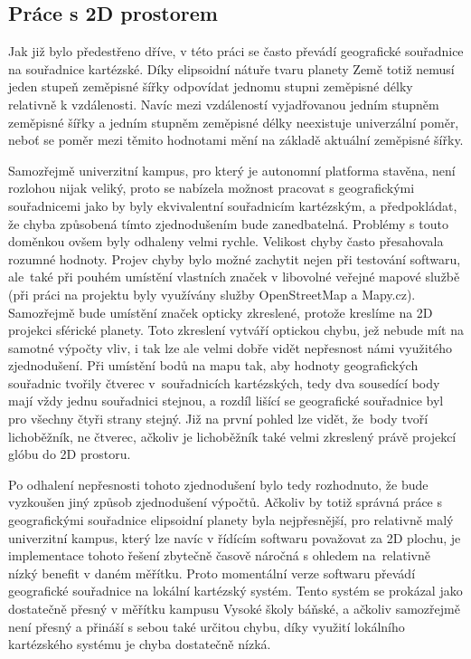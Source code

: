 \documentclass[czech, bachelor]{diploma}
\begin{document}
\subsection{Práce s 2D prostorem} \label{cartesian-coordinates}

Jak již bylo předestřeno dříve, v této práci se často převádí geografické souřadnice na souřadnice kartézské. Díky elipsoidní
nátuře tvaru planety Země totiž nemusí jeden stupeň zeměpisné šířky odpovídat jednomu stupni zeměpisné délky relativně
k vzdálenosti. Navíc mezi vzdáleností vyjadřovanou jedním stupněm zeměpisné šířky a jedním stupněm zeměpisné délky neexistuje
univerzální poměr, neboť se poměr mezi těmito hodnotami mění na základě aktuální zeměpisné šířky.

Samozřejmě univerzitní kampus, pro který je autonomní platforma stavěna, není rozlohou nijak veliký, proto se nabízela možnost
pracovat s geografickými souřadnicemi jako by byly ekvivalentní souřadnicím kartézským, a předpokládat, že chyba způsobená tímto
zjednodušením bude zanedbatelná. Problémy s touto doměnkou ovšem byly odhaleny velmi rychle. Velikost chyby často přesahovala
rozumné hodnoty. Projev chyby bylo možné zachytit nejen při testování softwaru, ale~také při pouhém umístění vlastních značek
v libovolné veřejné mapové službě (při práci na projektu byly využívány služby OpenStreetMap a Mapy.cz). Samozřejmě bude umístění
značek opticky zkreslené, protože kreslíme na 2D projekci sférické planety. Toto zkreslení vytváří optickou chybu, jež nebude mít
na samotné výpočty vliv, i tak lze ale velmi dobře vidět nepřesnost námi využitého zjednodušení. Při umístění bodů na mapu tak,
aby hodnoty geografických souřadnic tvořily čtverec v~souřadnicích kartézských, tedy dva sousedící body mají vždy jednu souřadnici
stejnou, a rozdíl lišící se geografické souřadnice byl pro všechny čtyři strany stejný. Již na první pohled lze vidět, že~body
tvoří lichoběžník, ne čtverec, ačkoliv je lichoběžník také velmi zkreslený právě projekcí glóbu do 2D prostoru.

Po odhalení nepřesnosti tohoto zjednodušení bylo tedy rozhodnuto, že bude vyzkoušen jiný způsob zjednodušení výpočtů. Ačkoliv by
totiž správná práce s geografickými souřadnice elipsoidní planety byla nejpřesnější, pro relativně malý univerzitní kampus, který
lze navíc v řídícím softwaru považovat za 2D plochu, je implementace tohoto řešení zbytečně časově náročná s ohledem na~relativně
nízký benefit v daném měřítku. Proto momentální verze softwaru převádí geografické souřadnice na lokální kartézský systém. Tento
systém se prokázal jako dostatečně přesný v měřítku kampusu Vysoké školy báňské, a ačkoliv samozřejmě není přesný a přináší
s sebou také určitou chybu, díky využití lokálního kartézského systému je chyba dostatečně nízká.
\end{document}
